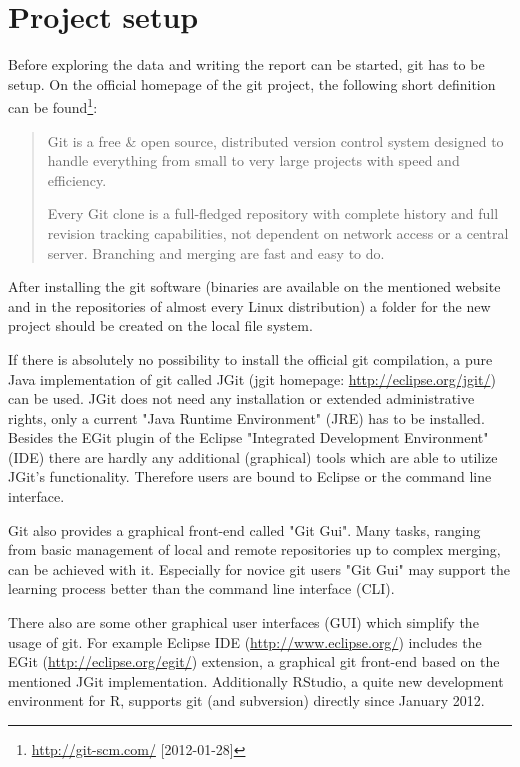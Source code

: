 \documentclass{ifacconf}
\begin{document}
\section{Project setup}

Before exploring the data and writing the report can be started, git has to be setup.
On the official homepage of the git project, the following short definition 
can be found\footnote{\url{http://git-scm.com/} [2012-01-28]}:

\begin{quotation}
Git is a free \& open source, distributed version control 
system designed to handle everything from small to very large projects with speed and efficiency.

Every Git clone is a full-fledged repository with complete 
history and full revision tracking capabilities, not 
dependent on network access or a central server. Branching and merging are fast and easy to do.
\end{quotation}

After installing the git software (binaries are available on the mentioned website and in 
the repositories of almost every Linux distribution) a folder for the new project should be 
created on the local file system. 

If there is absolutely no possibility to install
the official git compilation, a pure Java implementation of git called JGit (jgit homepage: 
\url{http://eclipse.org/jgit/}) can be used. JGit does not need any installation or
extended administrative rights, only a current "Java Runtime Environment" (JRE) has
to be installed. Besides the EGit plugin of the Eclipse "Integrated Development 
Environment" (IDE) there are hardly any additional (graphical) tools which are able
to utilize JGit's functionality. Therefore users are bound to Eclipse or the 
command line interface.

Git also provides a graphical front-end called "Git Gui". Many tasks, ranging from
basic management of local and remote repositories up to complex merging, can be
achieved with it. Especially for novice git users "Git Gui" may support the learning 
process better than the command line interface (CLI).

There also are some other graphical user interfaces (GUI) which
simplify the usage of git. For example Eclipse IDE 
(\url{http://www.eclipse.org/}) includes the EGit
(\url{http://eclipse.org/egit/}) extension, a graphical git front-end based on
the mentioned JGit implementation. Additionally RStudio, a quite new development 
environment for R, supports git (and subversion) directly since January 2012.
\end{document}
